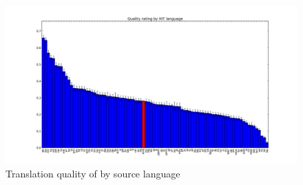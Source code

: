 \documentclass[11pt]{article}
\begin{document}
\begin{figure}[h]
\centering
\includegraphics[width=6in]{figures/quality-hitlang}
\caption{Translation quality of by source language}
\label{hitlangqual-bar}
\end{figure}
\end{document}
